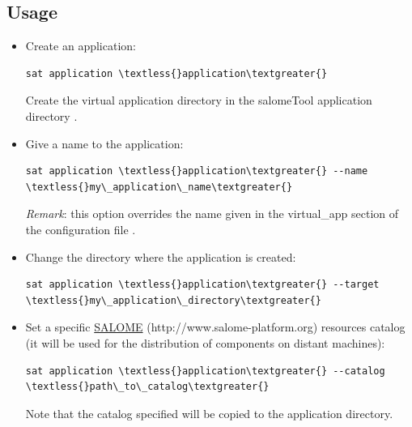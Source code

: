 \documentclass[a4paper,10pt,english]{sphinxmanual}
\begin{document}
\subsection{Usage}
\label{commands/application:usage}\begin{itemize}
\item {} 
Create an application:

\begin{Verbatim}[commandchars=\\\{\}]
sat application \textless{}application\textgreater{}
\end{Verbatim}

Create the virtual application directory in the salomeTool application directory .

\item {} 
Give a name to the application:

\begin{Verbatim}[commandchars=\\\{\}]
sat application \textless{}application\textgreater{} --name \textless{}my\_application\_name\textgreater{}
\end{Verbatim}

\emph{Remark}: this option overrides the name given in the virtual\_app section of the configuration file .

\item {} 
Change the directory where the application is created:

\begin{Verbatim}[commandchars=\\\{\}]
sat application \textless{}application\textgreater{} --target \textless{}my\_application\_directory\textgreater{}
\end{Verbatim}

\item {} 
Set a specific \href{http://www.salome-platform.org}{SALOME} (http://www.salome-platform.org) resources catalog (it will be used for the distribution of components on distant machines):

\begin{Verbatim}[commandchars=\\\{\}]
sat application \textless{}application\textgreater{} --catalog \textless{}path\_to\_catalog\textgreater{}
\end{Verbatim}

Note that the catalog specified will be copied to the application directory.


\end{itemize}
\end{document}
